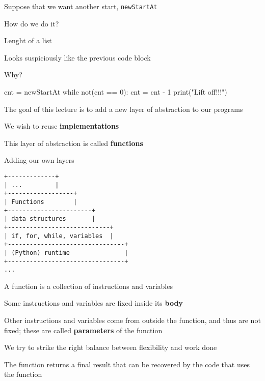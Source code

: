 \documentclass{beamer}
\begin{document}
\begin{slide}{
\item Suppose that we want another start, \texttt{newStartAt}
\item How do we do it?
}\end{slide}

\begin{frame}[fragile]{Lenght of a list}
\begin{codewithblock}{\pause \item Looks suspiciously like the previous code block \item Why?}

cnt = newStartAt
while not(cnt == 0):
  cnt = cnt - 1
print("Lift off!!!")
\end{codewithblock}
\end{frame}

\begin{slide}{
\item The goal of this lecture is to add a new layer of abstraction to our programs
\item We wish to reuse \textbf{implementations}
\item This layer of abstraction is called \textbf{functions}
}\end{slide}

\begin{frame}[fragile]{Adding our own layers}
\begin{lstlisting}
+-------------+
| ...         |
+------------------+
| Functions        |
+-----------------------+
| data structures       |
+----------------------------+
| if, for, while, variables  |
+--------------------------------+
| (Python) runtime               |
+--------------------------------+
...
\end{lstlisting}
\end{frame}

\begin{slide}{
\item A function is a collection of instructions and variables
\item Some instructions and variables are fixed inside its \textbf{body}
\item Other instructions and variables come from outside the function, and thus are not fixed; these are called \textbf{parameters} of the function
\item We try to strike the right balance between flexibility and work done
\item The function returns a final result that can be recovered by the code that uses the function
}\end{slide}
\end{document}
